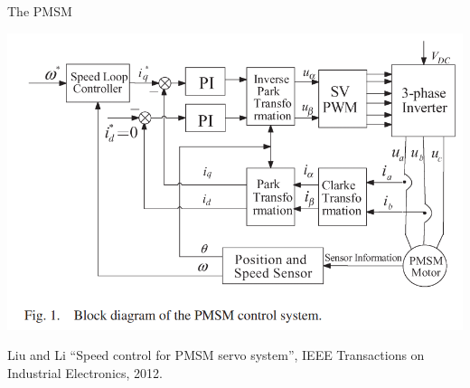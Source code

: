 \documentclass[presentation,aspectratio=1610]{beamer}
\begin{document}
\begin{frame}[label={sec:orgb21b305}]{The PMSM}
\begin{center}
\includegraphics[width=0.8\linewidth]{../../figures/pmsm_control_block_diag.png}
\end{center}
{\footnotesize Liu and Li  ``Speed control for PMSM servo system'', IEEE Transactions on Industrial Electronics, 2012.}
\end{frame}
\end{document}
